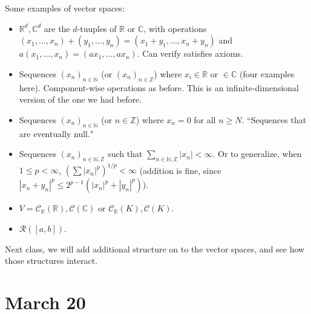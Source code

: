 \documentclass{article}
\theoremstyle{plain}
\theoremstyle{remark}
\newcommand{\N}{{\mathbb N}}
\newcommand{\Z}{{\mathbb Z}}
\newcommand{\R}{{\mathbb R}}
\newcommand{\C}{{\mathbb C}}
\begin{document}
Some examples of vector spaces:
\begin{itemize}
	\item $\R^d, \C^d$ are the $d$-tuuples of $\R$ or $\C$,
		with operations $(x_1,\dots,x_n) + (y_1,\dots,y_n) = (x_1+y_1,\dots,x_n+y_n)$
		and $a(x_1,\dots,x_n) = (ax_1,\dots,ax_n)$.
		Can verify satisfies axioms.
	\item Sequences $(x_n)_{n\in\N}$ (or $(x_n)_{n \in \Z}$)
		where $x_i \in \R$ or $\in \C$ (four examples here).
		Component-wise operations as before.
		This is an infinite-dimensional version of the one we had before.
	\item Sequences $(x_n)_{n\in\N}$ (or $n \in \Z$) where
		$x_n = 0$ for all $n \geq N$.
		``Sequences that are eventually null."
	\item Sequences $(x_n)_{n\in \N,\Z}$ such that $\sum_{n \in \N,\Z} |x_n| < \infty$.
		Or to generalize, when $1 \leq p < \infty$,
		$\left(\sum |x_n|^p \right)^{1/p} < \infty$
		(addition is fine, since $|x_n + y_n|^p \leq 2^{p-1}\left(|x_n|^p + |y_n|^p\right)$).
	\item $V = \mathcal{C}_\R(\R), \mathcal{C}(\C)$ or $\mathcal{C}_\R(K),\mathcal{C}(K)$.
	\item $\mathcal{R}([a,b])$.
\end{itemize}
Next class, we will add additional structure on to the vector spaces,
and see how those structures interact.


\section{March 20}
\end{document}
